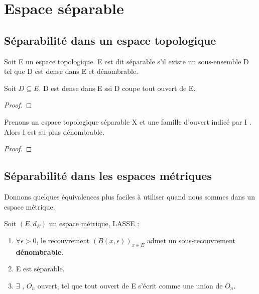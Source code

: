 \chapter{Espace séparable}

\section{Séparabilité dans un espace topologique}

\begin{definition}
	Soit E un espace topologique.
	E est dit séparable s'il existe un sous-ensemble D tel que D est dense dans
	E et dénombrable.
\end{definition}

\begin{proposition}
	Soit $D \subseteq E$.
	D est dense dans E ssi D coupe tout ouvert de E.
\end{proposition}

\begin{proof}

\end{proof}

\begin{proposition}
	Prenons un espace topologique séparable X et une famille d'ouvert indicé par
	I . Alors I est au plus dénombrable.
\end{proposition}

\begin{proof}
	
\end{proof}

\section{Séparabilité dans les espaces métriques}

Donnons quelques équivalences plus faciles à utiliser quand nous sommes dans un
espace métrique.

\begin{proposition}
	Soit $(E, d_{E})$ un espace métrique, LASSE :
	\begin{enumerate}
		\item $\forall \epsilon > 0$, le recouvrement $(B(x, \epsilon))_{x \in
			E}$ admet un sous-recouvrement \textbf{dénombrable}.
		\item E est séparable.
		\item $\exists$ , $O_{n}$ ouvert, tel que
			tout ouvert de E s'écrit comme une union de $O_{n}$.
	\end{enumerate}
\end{proposition}


